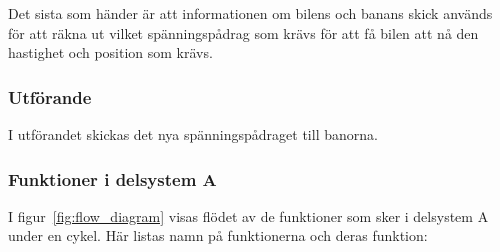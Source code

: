    Det sista som händer är att  informationen om bilens och banans skick används
    för att räkna ut vilket spänningspådrag som krävs för att få bilen att nå
    den hastighet och position som krävs.

    \subsubsection{Utförande}

    I utförandet skickas det nya spänningspådraget till banorna. 
	

    \subsubsection{Funktioner i delsystem A} \label{sec:system_a_funcs}
    I figur~\ref{fig:flow_diagram}  visas flödet av de funktioner som sker i delsystem A under en cykel.
    Här listas namn på funktionerna och deras funktion:
